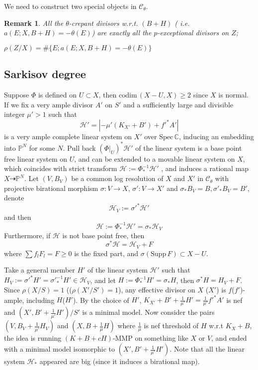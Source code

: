 \documentclass{article}
\newtheorem{rmk}[defn]{Remark}
\begin{document}
We need to construct two special objects in $ \mathcal{C}_\theta $.

\begin{rmk}
  All the $ \theta $-crepant divisors w.r.t. $ (B+H) $ ( i.e. $ a(E;X,B+H)=-\theta (E) $)  are exactly all the $ p $-exceptional divisors on $ Z $;

  $ \rho(Z/X)=\#\{E;a(E;X,B+H)=-\theta (E) \} $
\end{rmk}


\subsection{Sarkisov degree}

Suppose $ \Phi $ is defined on $ U\subset X $, then $ \mathrm{codim}\,(X-U,X)\geqslant 2 $ since $ X $ is normal. If we fix a very ample divisor $ A'  $ on $ S' $ and a sufficiently large and divisible integer $ \mu'>1 $ such that 
$$ \mathcal{H}'=|-\mu' (K_{X'}+B') +f'^*A'| $$
is a very ample complete linear system on $ X' $ over $ \mathrm{Spec}\,\mathbb{C} $,  inducing an embedding into $ \mathbb{P}^N $ for some $ N $. Pull back $ (\Phi|_U)^*\mathcal{H}' $ of the linear system is a base point free linear system on $ U $, and can be extended  to a movable linear system on $ X $, which coincides with strict transform $ \mathcal{H}:=\Phi^{-1}_*\mathcal{H}' $ , and induces a rational map $ X\dashrightarrow \mathbb{P}^N $. Let $ (V,B_V) $ be a common log resolution of $ X $ and $ X' $ in $ \mathcal{C}_\theta $ with projective birational morphism $ \sigma:V\to X$,   $\sigma':V\to X' $ and $\sigma_*B_V=B, \sigma'_*B_V=B' $, denote
$$ \mathcal{H}_V:=\sigma'^*\mathcal{H}' $$
and then 
$$ \mathcal{H}:=\Phi^{-1}_*\mathcal{H}'=\sigma_*\mathcal{H}_V $$
Furthermore, if $ \mathcal{H} $ is not base point free, then
$$ \sigma^*\mathcal{H}=\mathcal{H}_V+F $$
where $ \sum f_lF_l=F\geqslant0 $ is the fixed part, and $ \sigma(\mathrm{Supp}\,F)\subset X-U $. 

Take a general member $ H' $ of the linear system $ \mathcal{H}' $ such that $ H_V:=\sigma'^*H'=\sigma'^{-1}_*H'\in \mathcal{H}_V $, and let $ H:=\Phi^{-1}_*H'=\sigma_*H $, then $ \sigma^*H=H_V+F $. Since $ \rho(X/S)=1 $ (($\rho( X'/S')=1 $), any effective divisor on $ X $ ($ X' $) is $ f $($ f' $)-ample, including $ H $($ H' $). 
By the choice of $ H' $,  $ K_{X'}+B'+\frac{1}{\mu'}H'=\frac{1}{\mu'}f'^*A' $ is nef and $ (X',B'+\frac{1}{\mu'}H')/S' $ is a  minimal model. Now consider the pairs $ (V,B_V+\frac{1}{\mu'}H_V) $ and $ (X,B+\frac{1}{\mu} H) $ where $ \frac{1}{\mu} $ is nef threshold of $ H $ w.r.t $ K_X+B $, the idea is running $ (K+B+cH) $-MMP on something like $ X $ or $ V $, and ended with a minimal model isomorphic to $ (X',B'+\frac{1}{\mu'}H') $. Note that all the linear system $ \mathcal{H}_* $ appeared are big (since it induces a birational map). 
\end{document}

